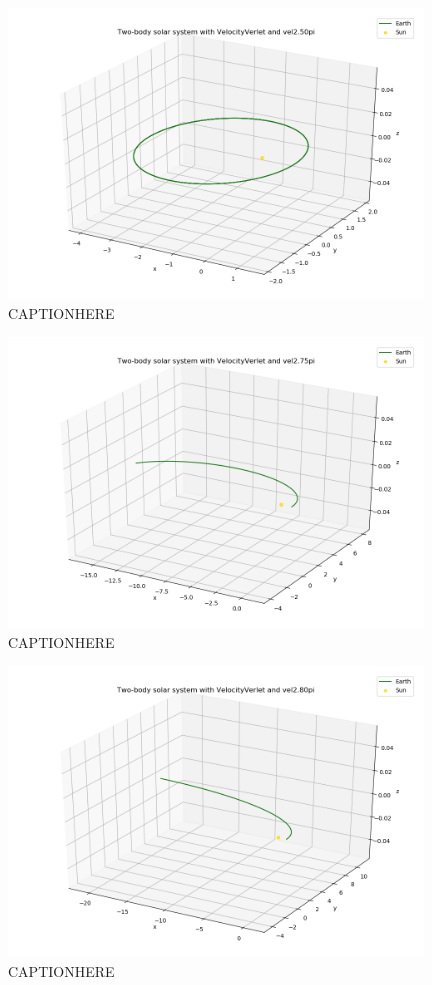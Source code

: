\documentclass{article}
\begin{document}
    \begin{figure}[H]
        \centering
        \includegraphics[width = 11cm]{img/plot3D_S_E_V_vel250pi.png}
        \caption{CAPTIONHERE}
        \label{fig:plot3D_S_E_V_vel250pi}
    \end{figure}

    \begin{figure}[H]
        \centering
        \includegraphics[width = 11cm]{img/plot3D_S_E_V_vel275pi.png}
        \caption{CAPTIONHERE}
        \label{fig:plot3D_S_E_V_vel275pi}
    \end{figure}

    \begin{figure}[H]
        \centering
        \includegraphics[width = 11cm]{img/plot3D_S_E_V_vel280pi.png}
        \caption{CAPTIONHERE}
        \label{fig:plot3D_S_E_V_vel280pi}
    \end{figure}
\end{document}
